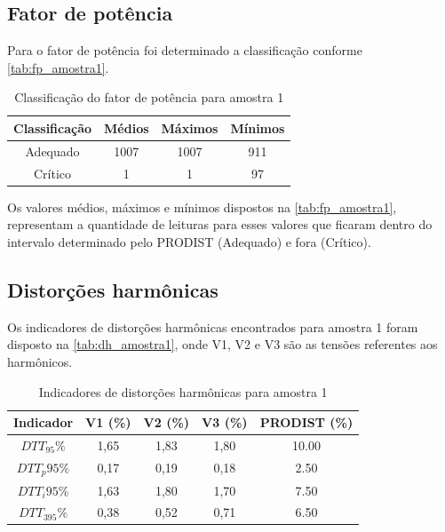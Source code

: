 \subsection{Fator de potência}

Para o fator de potência foi determinado a classificação conforme \autoref{tab:fp_amostra1}.

\begin{table}[H]
  \centering
  \caption{Classificação do fator de potência para amostra 1}
  \label{tab:fp_amostra1}
  \begin{tabular}{@{}cccc@{}}
    \toprule
    Classificação & Médios & Máximos & Mínimos \\
    \midrule
    Adequado & 1007 & 1007 & 911 \\
    Crítico & 1 & 1 & 97 \\
    \bottomrule
  \end{tabular}
\end{table}

Os valores médios, máximos e mínimos dispostos na \autoref{tab:fp_amostra1}, representam a quantidade de leituras para esses valores que ficaram dentro do intervalo determinado pelo PRODIST (Adequado) e fora (Crítico).

\subsection{Distorções harmônicas}

Os indicadores de distorções harmônicas encontrados para amostra 1 foram disposto na \autoref{tab:dh_amostra1}, onde V1, V2 e V3 são as tensões referentes aos harmônicos.

\begin{table}[H]
  \centering
  \caption{Indicadores de distorções harmônicas para amostra 1}
  \label{tab:dh_amostra1}
  \begin{tabular}{@{}ccccc@{}}
    \toprule
    Indicador & V1 (\%) & V2 (\%) & V3 (\%) & PRODIST  (\%) \\
    \midrule
    $DTT_95\%$   & 1,65 & 1,83 & 1,80 & 10.00 \\
    $DTT_p95\%$ & 0,17 & 0,19 & 0,18 & 2.50 \\
    $DTT_i95\%$ & 1,63 & 1,80 & 1,70 & 7.50 \\
    $DTT_395\%$ & 0,38 & 0,52 & 0,71 & 6.50 \\
    \bottomrule
  \end{tabular}
\end{table}

